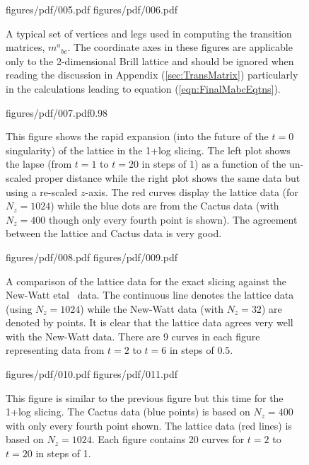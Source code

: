 \documentclass[a4paper,12pt]{article}
\numberwithin{equation}{section}
\begin{document}
\begin{figure}[!ht]
\FigPair%
{figures/pdf/005.pdf}{\mywd}%
{figures/pdf/006.pdf}{\mywd}%
\caption{A typical set of vertices and legs used in computing the transition
matrices, $m^a{}_{bc}$. The coordinate axes in these figures are applicable
only to the 2-dimensional Brill lattice and should be ignored when reading the
discussion in Appendix (\ref{sec:TransMatrix}) particularly in the
calculations leading to equation (\ref{eqn:FinalMabcEqtns}).}
\label{fig:CartanConn}
\end{figure}

\begin{figure}[!ht]
\Figure%
{figures/pdf/007.pdf}{0.98}%
\caption{This figure shows the rapid expansion (into the future of the $t=0$
singularity) of the lattice in the 1+log slicing. The left plot shows the
lapse (from $t=1$ to $t=20$ in steps of 1) as a function of the un-scaled
proper distance while the right plot shows the same data but using a re-scaled
$z$-axis. The red curves display the lattice data (for $N_z=1024$) while the
blue dots are from the Cactus data (with $N_z=400$ though only every fourth
point is shown). The agreement between the lattice and Cactus data is very
good.}
\label{fig:GowdyA}
\end{figure}

\newpage

\begin{figure}[!ht]
\FigPair%
{figures/pdf/008.pdf}{\mywd}%
{figures/pdf/009.pdf}{\mywd}%
\caption{A comparison of the lattice data for the exact slicing against the
New-Watt etal~\cite{new-kc:1998-01} data. The continuous line denotes the
lattice data (using $N_z=1024$) while the New-Watt data (with $N_z=32$) are
denoted by points. It is clear that the lattice data agrees very well with
the New-Watt data. There are 9 curves in each figure representing data from
$t=2$ to $t=6$ in steps of $0.5$.}
\label{fig:GowdyB}
\end{figure}

\begin{figure}[!ht]
\FigPair%
{figures/pdf/010.pdf}{\mywd}%
{figures/pdf/011.pdf}{\mywd}%
\caption{This figure is similar to the previous figure but this time for the
1+log slicing. The Cactus data (blue points) is based on $N_z=400$ with only
every fourth point shown. The lattice data (red lines) is based on $N_z=1024$.
Each figure contains 20 curves for $t=2$ to $t=20$ in steps of 1.}
\label{fig:GowdyC}
\end{figure}
\end{document}
